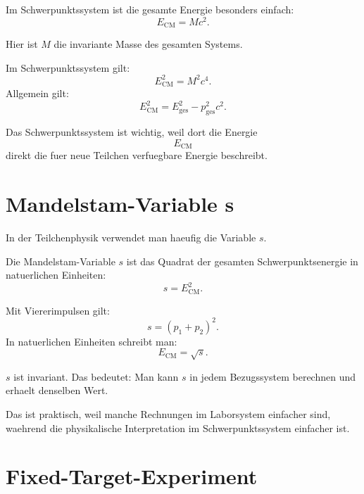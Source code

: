 \begin{conceptbox}
Im Schwerpunktssystem ist die gesamte Energie besonders einfach:
\[
    E_{\mathrm{CM}} = Mc^2.
\]

Hier ist $M$ die invariante Masse des gesamten Systems.
\end{conceptbox}

\begin{formulabox}
Im Schwerpunktssystem gilt:
\[
    E_{\mathrm{CM}}^2
    =
    M^2c^4.
\]
Allgemein gilt:
\[
    E_{\mathrm{CM}}^2
    =
    E_{\mathrm{ges}}^2
    -
    p_{\mathrm{ges}}^2c^2.
\]
\end{formulabox}

\begin{examtipbox}
Das Schwerpunktssystem ist wichtig, weil dort die Energie
\[
    E_{\mathrm{CM}}
\]
direkt die fuer neue Teilchen verfuegbare Energie beschreibt.
\end{examtipbox}

\section{Mandelstam-Variable s}

In der Teilchenphysik verwendet man haeufig die Variable $s$.

\begin{definitionbox}
Die Mandelstam-Variable $s$ ist das Quadrat der gesamten Schwerpunktsenergie in
natuerlichen Einheiten:
\[
    s = E_{\mathrm{CM}}^2.
\]
\end{definitionbox}

\begin{formulabox}
Mit Viererimpulsen gilt:
\[
    s
    =
    (p_1+p_2)^2.
\]
In natuerlichen Einheiten schreibt man:
\[
    E_{\mathrm{CM}}=\sqrt{s}.
\]
\end{formulabox}

\begin{conceptbox}
$s$ ist invariant.
Das bedeutet:
Man kann $s$ in jedem Bezugssystem berechnen und erhaelt denselben Wert.

Das ist praktisch, weil manche Rechnungen im Laborsystem einfacher sind, waehrend
die physikalische Interpretation im Schwerpunktssystem einfacher ist.
\end{conceptbox}

\section{Fixed-Target-Experiment}


